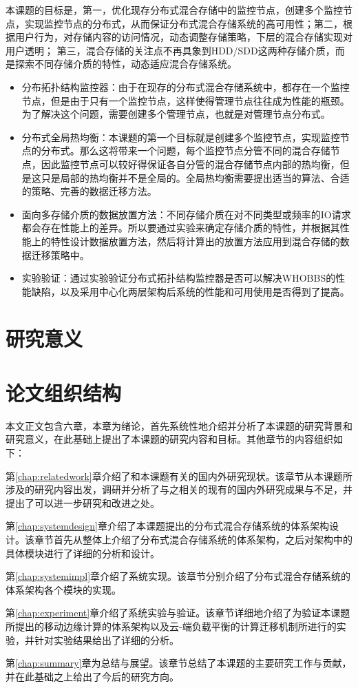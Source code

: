 本课题的目标是，第一，优化现存分布式混合存储中的监控节点，创建多个监控节点，实现监控节点的分布式，从而保证分布式混合存储系统的高可用性；第二，根据用户行为，对存储内容的访问情况，动态调整存储策略，下层的混合存储实现对用户透明；
第三，混合存储的关注点不再具象到HDD/SDD这两种存储介质，而是探索不同存储介质的特性，动态适应混合存储系统。

\begin{itemize}[noitemsep,topsep=0pt,parsep=10pt,partopsep=10pt]
	\item 分布拓扑结构监控器：由于在现存的分布式混合存储系统中，都存在一个监控节点，但是由于只有一个监控节点，这样使得管理节点往往成为性能的瓶颈。为了解决这个问题，需要创建多个管理节点，也就是对管理节点分布式。
	\item 分布式全局热均衡：本课题的第一个目标就是创建多个监控节点，实现监控节点的分布式。那么这将带来一个问题，每个监控节点分管不同的混合存储节点，因此监控节点可以较好得保证各自分管的混合存储节点内部的热均衡，但是这只是局部的热均衡并不是全局的。全局热均衡需要提出适当的算法、合适的策略、完善的数据迁移方法。	
	\item 面向多存储介质的数据放置方法：不同存储介质在对不同类型或频率的IO请求都会存在性能上的差异。所以要通过实验来确定存储介质的特性，并根据其性能上的特性设计数据放置方法，然后将计算出的放置方法应用到混合存储的数据迁移策略中。
	\item 实验验证：通过实验验证分布式拓扑结构监控器是否可以解决WHOBBS的性能缺陷，以及采用中心化两层架构后系统的性能和可用使用是否得到了提高。
\end{itemize}

\section{研究意义}



\section{论文组织结构}
本文正文包含六章，本章为绪论，首先系统性地介绍并分析了本课题的研究背景和研究意义，在此基础上提出了本课题的研究内容和目标。其他章节的内容组织如下：

第\ref{chap:relatedwork}章介绍了和本课题有关的国内外研究现状。该章节从本课题所涉及的研究内容出发，调研并分析了与之相关的现有的国内外研究成果与不足，并提出了可以进一步研究和改进之处。

第\ref{chap:systemdesign}章介绍了本课题提出的分布式混合存储系统的体系架构设计。该章节首先从整体上介绍了分布式混合存储系统的体系架构，之后对架构中的具体模块进行了详细的分析和设计。

第\ref{chap:systemimpl}章介绍了系统实现。该章节分别介绍了分布式混合存储系统的体系架构各个模块的实现。

第\ref{chap:experiment}章介绍了系统实验与验证。该章节详细地介绍了为验证本课题所提出的移动边缘计算的体系架构以及云-端负载平衡的计算迁移机制所进行的实验，并针对实验结果给出了详细的分析。

第\ref{chap:summary}章为总结与展望。该章节总结了本课题的主要研究工作与贡献，并在此基础之上给出了今后的研究方向。